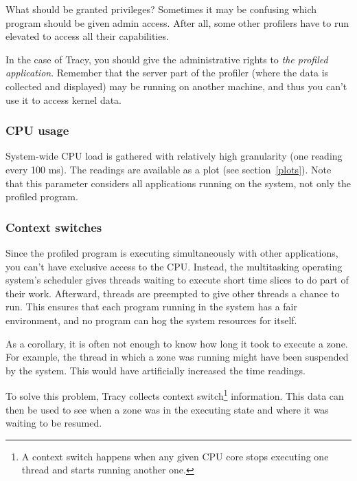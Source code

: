 \documentclass[hidelinks,titlepage,a4paper,twoside]{article}
\begin{document}
\begin{bclogo}[
noborder=true,
couleur=black!5,
logo=\bclampe
]{What should be granted privileges?}
Sometimes it may be confusing which program should be given admin access. After all, some other profilers have to run elevated to access all their capabilities.

In the case of Tracy, you should give the administrative rights to \emph{the profiled application}. Remember that the server part of the profiler (where the data is collected and displayed) may be running on another machine, and thus you can't use it to access kernel data.
\end{bclogo}

\subsubsection{CPU usage}

System-wide CPU load is gathered with relatively high granularity (one reading every 100 \si{\milli\second}). The readings are available as a plot (see section~\ref{plots}). Note that this parameter considers all applications running on the system, not only the profiled program.

\subsubsection{Context switches}
\label{contextswitches}

Since the profiled program is executing simultaneously with other applications, you can't have exclusive access to the CPU. Instead, the multitasking operating system's scheduler gives threads waiting to execute short time slices to do part of their work. Afterward, threads are preempted to give other threads a chance to run. This ensures that each program running in the system has a fair environment, and no program can hog the system resources for itself.

As a corollary, it is often not enough to know how long it took to execute a zone. For example, the thread in which a zone was running might have been suspended by the system. This would have artificially increased the time readings.

To solve this problem, Tracy collects context switch\footnote{A context switch happens when any given CPU core stops executing one thread and starts running another one.} information. This data can then be used to see when a zone was in the executing state and where it was waiting to be resumed.
\end{document}
